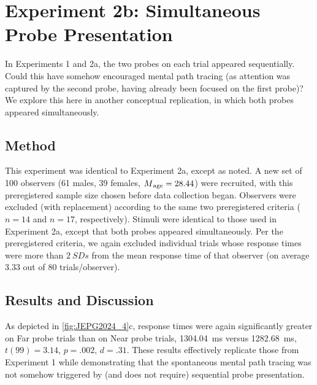 \section{Experiment 2b: Simultaneous Probe Presentation}
In Experiments 1 and 2a, the two probes on each trial appeared sequentially. Could this have somehow encouraged mental path tracing (as attention was captured by the second probe, having already been focused on the first probe)? We explore this here in another conceptual replication, in which both probes appeared simultaneously.

\subsection{Method}
This experiment was identical to Experiment 2a, except as noted. A new set of 100 observers (61 males, 39 females, $M\textsubscript{age} = 28.44$) were recruited, with this preregistered sample size chosen before data collection began. Observers were excluded (with replacement) according to the same two preregistered criteria ($n = 14$ and $n = 17$, respectively). Stimuli were identical to those used in Experiment 2a, except that both probes appeared simultaneously. Per the preregistered criteria, we again excluded individual trials whose response times were more than $2~SDs$ from the mean response time of that observer (on average 3.33 out of 80 trials/observer).

\subsection{Results and Discussion}
As depicted in \cref{fig:JEPG2024_4}c, response times were again significantly greater on Far probe trials than on Near probe trials, \qty{1304.04}{\milli\second} versus \qty{1282.68}{\milli\second}, $t(99) = 3.14$, $p = .002$, $d = .31$. These results effectively replicate those from Experiment 1 while demonstrating that the spontaneous mental path tracing was not somehow triggered by (and does not require) sequential probe presentation.

